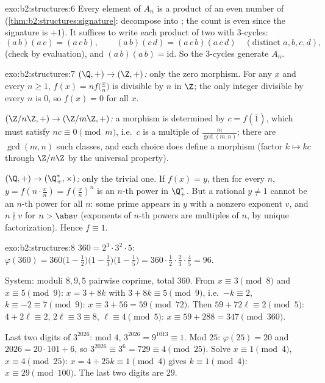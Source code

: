 \begin{solution}{exo:b2:structures:6}
Every element of $A_n$ is a product of an even number of
 (\cref{thm:b2:structures:signature}: decompose into
; the count is even since the signature is $+1$). It
suffices to write each product of two  with
$3$-cycles:
\[
(a\,b)(a\,c) = (a\,c\,b),
\qquad
(a\,b)(c\,d) = (a\,c\,b)(a\,c\,d) \quad (\text{distinct } a,b,c,d),
\]
(check by evaluation), and $(a\,b)(a\,b) = \mathrm{id}$. So the
$3$-cycles generate $A_n$.
\end{solution}

\begin{solution}{exo:b2:structures:7}
\emph{$(\Q,+) \to (\Z,+)$:} only the zero morphism. For any $x$ and
every $n \geq 1$, $f(x) = n f\bigl(\frac xn\bigr)$ is divisible by
$n$ in $\Z$; the only integer divisible by every $n$ is $0$, so
$f(x) = 0$ for all $x$.

\emph{$(\Z/n\Z, +) \to (\Z/m\Z, +)$:} a morphism is determined by
$c = f(\overline 1)$, which must satisfy $n c \equiv 0 \pmod m$,
i.e.\ $c$ is a multiple of $\frac{m}{\gcd(m,n)}$; there are
$\gcd(m,n)$ such classes, and each choice does define a morphism
(factor $k \mapsto kc$ through $\Z/n\Z$ by the universal property).

\emph{$(\Q, +) \to (\Q_+^*, \times)$:} only the trivial one. If
$f(x) = y$, then for every $n$, $y = f(n \cdot \frac xn) =
f(\frac xn)^n$ is an $n$-th power in $\Q_+^*$. But a rational
$y \neq 1$ cannot be an $n$-th power for all $n$: some prime appears
in $y$ with a nonzero exponent $v$, and $n \nmid v$ for $n > \abs
v$ (exponents of $n$-th powers are multiples of $n$, by unique
factorization). Hence $f \equiv 1$.
\end{solution}

\begin{solution}{exo:b2:structures:8}
$360 = 2^3 \cdot 3^2 \cdot 5$:
$\varphi(360) = 360\bigl(1 - \tfrac12\bigr)\bigl(1 -
\tfrac13\bigr)\bigl(1 - \tfrac15\bigr) = 360 \cdot \tfrac12 \cdot
\tfrac23 \cdot \tfrac45 = 96$.

System: moduli $8, 9, 5$ pairwise coprime, total $360$. From $x
\equiv 3 \pmod 8$ and $x \equiv 5 \pmod 9$: $x = 3 + 8k$ with $3 +
8k \equiv 5 \pmod 9$, i.e.\ $-k \equiv 2$, $k \equiv -2 \equiv 7
\pmod 9$: $x \equiv 3 + 56 = 59 \pmod{72}$. Then $59 + 72\ell \equiv
2 \pmod 5$: $4 + 2\ell \equiv 2$, $2\ell \equiv 3 \equiv 8$, $\ell
\equiv 4 \pmod 5$: $x \equiv 59 + 288 = 347 \pmod{360}$.

Last two digits of $3^{2026}$: mod $4$, $3^{2026} = 9^{1013} \equiv
1$. Mod $25$: $\varphi(25) = 20$ and $2026 = 20\cdot101 + 6$, so
$3^{2026} \equiv 3^6 = 729 \equiv 4 \pmod{25}$. Solve $x \equiv 1
\pmod 4$, $x \equiv 4 \pmod{25}$: $x = 4 + 25k \equiv 1 \pmod 4$
gives $k \equiv 1 \pmod 4$: $x \equiv 29 \pmod{100}$. The last two
digits are $29$.
\end{solution}

